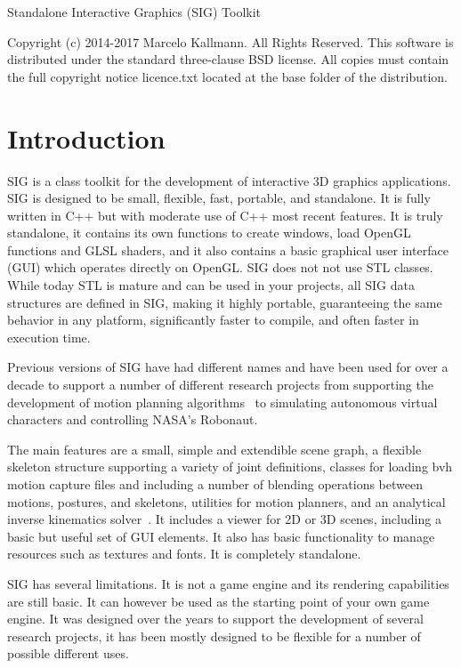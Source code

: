 


Standalone Interactive Graphics (SIG) Toolkit

   Copyright (c) 2014-2017 Marcelo Kallmann. All Rights Reserved.
   This software is distributed under the standard three-clause BSD license.
   All copies must contain the full copyright notice licence.txt located
   at the base folder of the distribution. 


\section{Introduction}

SIG is a class toolkit for the development of interactive 3D graphics applications. SIG is designed to be small, flexible, fast, portable, and standalone. It is fully written in C++ but with moderate use of C++ most recent features. It is truly standalone, it contains its own functions to create windows, load OpenGL functions and GLSL shaders, and it also contains a basic graphical user interface (GUI) which operates directly on OpenGL. SIG does not not use STL classes. While today STL is mature and can be used in your projects, all SIG data structures are defined in SIG, making it highly portable, guaranteeing the same behavior in any platform, significantly faster to compile, and often faster in execution time.

Previous versions of SIG have had different names and have been used for over a decade to support a number of different research projects from supporting the development of motion planning algorithms~\cite{kallmann05aiide,kallmann04sab} to simulating autonomous virtual characters and controlling NASA's Robonaut.

The main features are a small, simple and extendible scene graph, a flexible skeleton structure supporting a variety of joint definitions, classes for loading bvh motion capture files and including a number of blending operations between motions, postures, and skeletons, utilities for motion planners, and an analytical inverse kinematics solver~\cite{kallmann08cavw}. It includes a viewer for 2D or 3D scenes, including a basic but useful set of GUI elements. It also has basic functionality to manage resources such as textures and fonts. It is completely standalone.

SIG has several limitations. It is not a game engine and its rendering capabilities are still basic. It can however be used as the starting point of your own game engine. It was designed over the years to support the development of several research projects, it has been mostly designed to be flexible for a number of possible different uses. 

